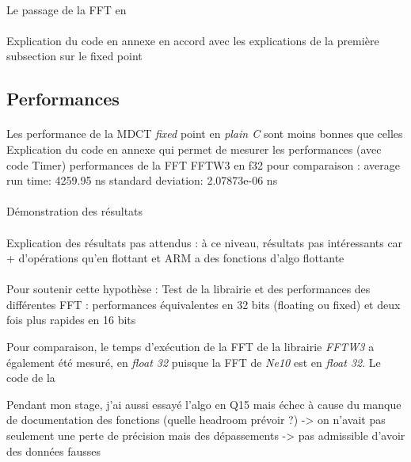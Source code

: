 \documentclass{article}
\begin{document}
    \paragraph{}
    Le passage de la FFT en \emph{}


    \paragraph{}
    Explication du code en annexe en accord avec les explications de la première subsection sur le fixed point

    \subsection{Performances}
    \paragraph{}
    Les performance de la MDCT \emph{fixed} point en \emph{plain C} sont moins bonnes que celles 
    Explication du code en annexe qui permet de mesurer les performances (avec code Timer)
    performances de la FFT FFTW3 en f32 pour comparaison :
    average run time:   4259.95 ns
    standard deviation: 2.07873e-06 ns


    \paragraph{}
    Démonstration des résultats

    \paragraph{}
    Explication des résultats pas attendus : à ce niveau, résultats pas intéressants car + d'opérations qu'en flottant et ARM a des fonctions d'algo flottante

    \paragraph{}
    Pour soutenir cette hypothèse :  Test de la librairie et des performances des différentes FFT : performances équivalentes en 32 bits (floating ou fixed) et deux fois plus rapides en 16 bits


    Pour comparaison, le temps d'exécution de la FFT de la librairie \emph{FFTW3} a également été mesuré, en \emph{float 32} puisque la FFT de \emph{Ne10} est en \emph{float 32}. Le code de la 

    Pendant mon stage, j'ai aussi essayé l'algo en Q15 mais échec à cause du manque de documentation des fonctions (quelle headroom prévoir ?) -> on n'avait pas seulement une perte de précision mais des dépassements -> pas admissible d'avoir des données fausses
\end{document}
